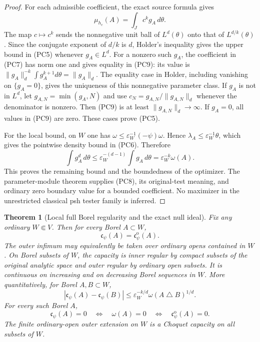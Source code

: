 \documentclass[11pt,a4paper]{article}
\numberwithin{equation}{section}
\newtheorem{theorem}{Theorem}[section]
\theoremstyle{definition}
\theoremstyle{remark}
\begin{document}
\begin{proof}
For each admissible coefficient, the exact source formula gives
\[
                       \mu_{h_c}(A)=\int_J c^k g_A\,d\theta.
                                                                    \tag{PC9}
\]
The map $c\mapsto c^k$ sends the nonnegative unit ball of
$L^d(\theta)$ onto that of $L^{d/k}(\theta)$. Since the
conjugate exponent of $d/k$ is $d$, Holder's inequality gives
the upper bound in (PC5) whenever $g_A\in L^d$.
For a nonzero such $g_A$, the coefficient in (PC7) has norm one
and gives equality in (PC9): its value is
$\|g_A\|_d^{-k}\int g_A^{k+1}d\theta=\|g_A\|_d$.
The equality case in Holder, including vanishing on $\{g_A=0\}$,
gives the uniqueness of this nonnegative parameter class.
If $g_A$ is not in $L^d$, let $g_{A,N}=\min(g_A,N)$ and use
$c_N=g_{A,N}/\|g_{A,N}\|_d$ whenever the denominator is nonzero.
Then (PC9) is at least $\|g_{A,N}\|_d\to\infty$.
If $g_A=0$, all values in (PC9) are zero. These cases prove (PC5).

For the local bound, on $W$ one has
$\omega\le\varepsilon_W^{-1}(-\psi)\omega$. Hence
$\lambda_A\le\varepsilon_W^{-1}\theta$, which gives the
pointwise density bound in (PC6). Therefore
\[
             \int g_A^d\,d\theta
                    \le\varepsilon_W^{-(d-1)}\int g_A\,d\theta
                    =\varepsilon_W^{-k}\omega(A).
\]
This proves the remaining bound and the boundedness of the
optimizer. The parameter-module theorem supplies (PC8), its
original-test meaning, and ordinary zero boundary value for a
bounded coefficient. No maximizer in the unrestricted classical
psh tester family is inferred.
\end{proof}

\begin{theorem}[Local full Borel regularity and the exact null ideal]
\label{thm:r12-parameter-energy-capacity-regularity}
Fix any ordinary $W\Subset V$. Then for every Borel $A\subset W$,
\[
                  \mathfrak c_\psi(A)=\mathfrak c_\psi^{\mathrm o}(A).
                                                                    \tag{PC10}
\]
The outer infimum may equivalently be taken over ordinary opens
contained in $W$. On Borel subsets of $W$, the capacity is inner
regular by compact subsets of the original analytic space and
outer regular by ordinary
open subsets. It is continuous on increasing and on decreasing
Borel sequences in $W$. More quantitatively, for Borel $A,B\subset W$,
\[
       |\mathfrak c_\psi(A)-\mathfrak c_\psi(B)|
                 \le\varepsilon_W^{-k/d}\omega(A\mathbin\triangle B)^{1/d}.
                                                                    \tag{PC11}
\]
For every such Borel $A$,
\[
       \mathfrak c_\psi(A)=0
          \quad\Longleftrightarrow\quad\omega(A)=0
          \quad\Longleftrightarrow\quad
                            \mathfrak c_\psi^{\mathrm o}(A)=0.
                                                                    \tag{PC12}
\]
The finite ordinary-open outer extension on $W$ is a Choquet
capacity on all subsets of $W$.
\end{theorem}
\end{document}
